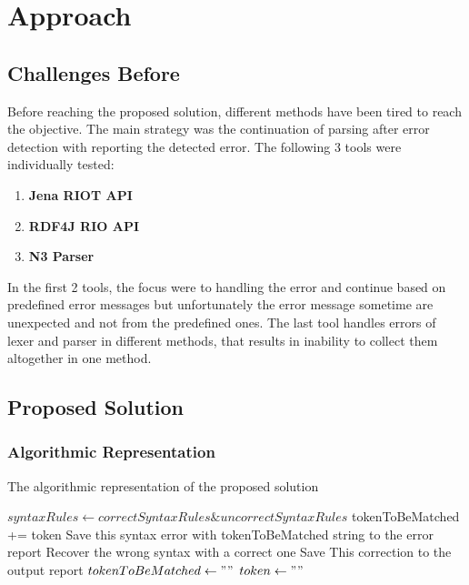 \chapter{Approach}
\label{ch:approach}
\newpage
\section{Challenges Before }
Before reaching the proposed solution, different methods have been tired to reach the objective. The main strategy was the continuation of parsing after error detection with reporting the detected error. The following 3 tools were individually tested:
\begin{enumerate}
	
	\item  {\bf Jena RIOT API} %
	\item {\bf RDF4J RIO API} %
	\item {\bf N3 Parser} %
\end{enumerate}
In the first 2 tools, the focus were to handling the error and continue based on predefined error messages but unfortunately the error message sometime are unexpected and not from the predefined ones. The last tool handles errors of lexer and parser in different methods, that results in inability to collect them altogether in one method.    

   
\section{Proposed Solution}

\subsection{Algorithmic Representation }
\begin{algorithm} 
	\caption{The algorithmic representation of the proposed solution} 
	\label{Algorithm} 
	\begin{algorithmic}[1]
		\STATE $syntaxRules \leftarrow correctSyntaxRules \& uncorrectSyntaxRules$  	
		\STATE tokenToBeMatched += token
		\STATE Save this syntax error with tokenToBeMatched string to the error report 
		\STATE  Recover the wrong syntax with a correct one 
		\STATE  Save This correction to the output report
		\ENDIF
		\ENDIF
		\ENDIF
		\STATE $tokenToBeMatched \leftarrow ""$  
		\STATE $token \leftarrow ""$  		
		\ENDIF
		\ENDWHILE
	\end{algorithmic}
\end{algorithm}
 
